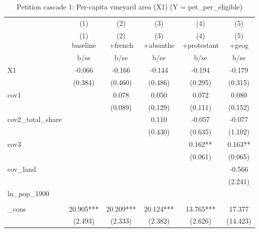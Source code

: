 \begin{table}[htbp]\centering
\def\sym#1{\ifmmode^{#1}\else\(^{#1}\)\fi}
\caption{Petition cascade 1: Per-capita vineyard area (X1)  (Y = pet\_per\_eligible) \label{tab:petcasc1}}
\begin{tabular}{l*{5}{c}}
\toprule
            &\multicolumn{1}{c}{(1)}&\multicolumn{1}{c}{(2)}&\multicolumn{1}{c}{(3)}&\multicolumn{1}{c}{(4)}&\multicolumn{1}{c}{(5)}\\
            &\multicolumn{1}{c}{(1) baseline}&\multicolumn{1}{c}{(2) +french}&\multicolumn{1}{c}{(3) +absinthe}&\multicolumn{1}{c}{(4) +protestant}&\multicolumn{1}{c}{(5) +geog}\\
            &        b/se   &        b/se   &        b/se   &        b/se   &        b/se   \\
\midrule
X1          &      -0.066   &      -0.166   &      -0.144   &      -0.194   &      -0.179   \\
            &     (0.384)   &     (0.460)   &     (0.486)   &     (0.295)   &     (0.315)   \\
cov1        &               &       0.078   &       0.050   &       0.072   &       0.080   \\
            &               &     (0.089)   &     (0.129)   &     (0.111)   &     (0.152)   \\
cov2\_total\_share&               &               &       0.110   &      -0.057   &      -0.077   \\
            &               &               &     (0.430)   &     (0.635)   &     (1.102)   \\
cov3        &               &               &               &       0.162** &       0.163** \\
            &               &               &               &     (0.061)   &     (0.065)   \\
cov\_land    &               &               &               &               &      -0.566   \\
            &               &               &               &               &     (2.241)   \\
ln\_pop\_1900 &               &               &               &               &               \\
            &               &               &               &               &               \\
\_cons      &      20.905***&      20.209***&      20.124***&      13.765***&      17.377   \\
            &     (2.493)   &     (2.333)   &     (2.382)   &     (2.626)   &    (14.423)   \\

\end{tabular}
\end{table}
